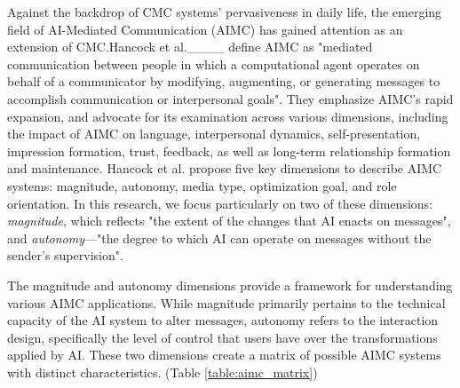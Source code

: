 Against the backdrop of CMC systems' pervasiveness in daily life, the emerging field of AI-Mediated Communication (AIMC) has gained attention as an extension of CMC.Hancock et al.____ define AIMC as "mediated communication between people in which a computational agent operates on behalf of a communicator by modifying, augmenting, or generating messages to accomplish communication or interpersonal goals". They emphasize AIMC's rapid expansion, and advocate for its examination across various dimensions, including the impact of AIMC on language, interpersonal dynamics, self-presentation, impression formation, trust, feedback, as well as long-term relationship formation and maintenance. Hancock et al. propose five key dimensions to describe AIMC systems: magnitude, autonomy, media type, optimization goal, and role orientation. In this research, we focus particularly on two of these dimensions: \textit{magnitude}, which reflects "the extent of the changes that AI enacts on messages", and \textit{autonomy}—"the degree to which AI can operate on messages without the sender's supervision".

The magnitude and autonomy dimensions provide a framework for understanding various AIMC applications. While magnitude primarily pertains to the technical capacity of the AI system to alter messages, autonomy refers to the interaction design, specifically the level of control that users have over the transformations applied by AI. These two dimensions create a matrix of possible AIMC systems with distinct characteristics. (Table \ref{table:aimc_matrix})

